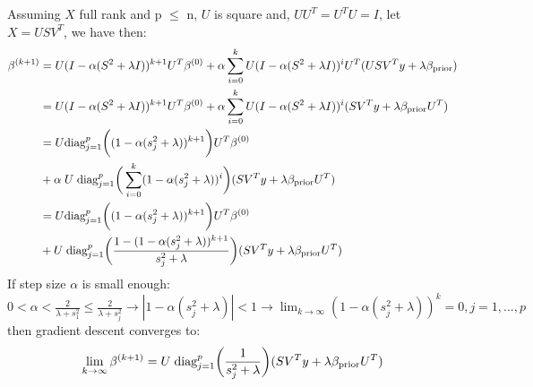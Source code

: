 \documentclass[12pt,twoside]{article}
\begin{document}
\begin{enumerate}
\begin{enumerate}
Assuming $X$ full rank and p $\le$ n, $U$ is square and, $UU^T = U^TU = I$, let $X = USV^T$, we have then:
\begin{align*}
		\beta^{(k+1)}	&=	U (I - \alpha (S^2 + \lambda I))^{k+1} U^T \beta^{(0)}		+ \alpha \sum_{i=0}^k 	U (I - \alpha (S^2 + \lambda I))^ i U^T (U S V^T y +  \lambda \beta_{\operatorname{prior}}) \\
					&=	U (I - \alpha (S^2 + \lambda I))^{k+1} U^T \beta^{(0)}		+ \alpha \sum_{i=0}^k 	U (I - \alpha (S^2 + \lambda I))^ i (S V^T y + \lambda \beta_{\operatorname{prior}}  U^T) \\
					&=	U \text{diag}_{j=1}^p \bigg( (1 - \alpha (s_j^2 + \lambda))^{k+1} \bigg)U^T \beta^{(0)}	\\
					&+ \alpha \; U  \;  \text{diag}_{j=1}^p \bigg( \sum_{i=0}^k (1 - \alpha (s_j^2 + \lambda))^i \bigg)  (S V^T y + \lambda \beta_{\operatorname{prior}}  U^T) \\
					&= U \text{diag}_{j=1}^p \bigg( (1 - \alpha (s_j^2 + \lambda))^{k+1} \bigg)U^T \beta^{(0)}	\\
					&+ U  \;  \text{diag}_{j=1}^p \bigg( \frac{ 1 - (1 - \alpha (s_j^2 + \lambda))^{k+1}} {s_j^2 + \lambda} \bigg)  (S V^T y + \lambda \beta_{\operatorname{prior}}  U^T)
\end{align*}
If step size $\alpha$ is small enough: $0 < \alpha < \frac{2} {\lambda + s_1^2} \le \frac{2} {\lambda + s_j^2} \rightarrow |1 - \alpha (s_j^2 + \lambda)| < 1 \rightarrow \lim_{k \rightarrow \infty} (1 - \alpha (s_j^2 + \lambda))^k =0, j=1, \dots ,p $ then gradient descent converges to:
$$\lim_{k \rightarrow \infty} \beta^{(k+1)} = U  \;  \text{diag}_{j=1}^p \bigg( \frac{1} {s_j^2 + \lambda} \bigg)  (S V^T y + \lambda \beta_{\operatorname{prior}}  U^T)$$


\end{enumerate}
\end{enumerate}
\end{document}
